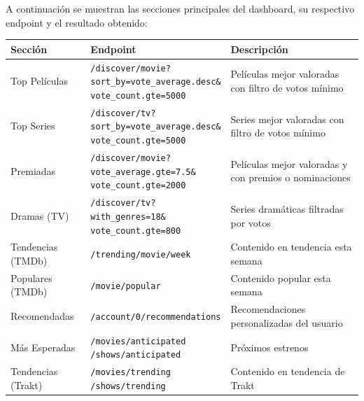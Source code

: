 A continuación se muestran las secciones principales del dashboard, su respectivo endpoint y el resultado obtenido:

\begin{table}[!htbp]
\begin{center}
\small
\begin{tabular}{| p{0.18\textwidth} | p{0.38\textwidth} | >{\raggedright\arraybackslash}p{0.34\textwidth} |}
\hline
\textbf{Sección} & \textbf{Endpoint} & \textbf{Descripción} \\
\hline
\hline
Top Películas & \parbox[t]{\linewidth}{\raggedright\strut\texttt{/discover/movie?}\\[2pt]\texttt{sort\_by=vote\_average.desc\&}\\[2pt]\texttt{vote\_count.gte=5000}\strut} & Películas mejor valoradas con filtro de votos mínimo \\
\hline
Top Series & \parbox[t]{\linewidth}{\raggedright\strut\texttt{/discover/tv?}\\[2pt]\texttt{sort\_by=vote\_average.desc\&}\\[2pt]\texttt{vote\_count.gte=5000}\strut} & Series mejor valoradas con filtro de votos mínimo \\
\hline
Premiadas & \parbox[t]{\linewidth}{\raggedright\strut\texttt{/discover/movie?}\\[2pt]\texttt{vote\_average.gte=7.5\&}\\[2pt]\texttt{vote\_count.gte=2000}\strut} & Películas mejor valoradas y con premios o nominaciones \\
\hline
Dramas (TV) & \parbox[t]{\linewidth}{\raggedright\strut\texttt{/discover/tv?}\\[2pt]\texttt{with\_genres=18\&}\\[2pt]\texttt{vote\_count.gte=800}\strut} & Series dramáticas filtradas por votos \\
\hline
Tendencias (TMDb) & \texttt{/trending/movie/week} & Contenido en tendencia esta semana \\
\hline
Populares (TMDb) & \texttt{/movie/popular} & Contenido popular esta semana \\
\hline
Recomendadas & \texttt{/account/0/recommendations} & Recomendaciones personalizadas del usuario \\
\hline
Más Esperadas & \parbox[t]{\linewidth}{\raggedright\strut\texttt{/movies/anticipated}\\[2pt]\texttt{/shows/anticipated}\strut} & Próximos estrenos \\
\hline
Tendencias (Trakt) & \parbox[t]{\linewidth}{\raggedright\strut\texttt{/movies/trending}\\[2pt]\texttt{/shows/trending}\strut} & Contenido en tendencia de Trakt \\

\end{tabular}
\end{center}
\end{table}

